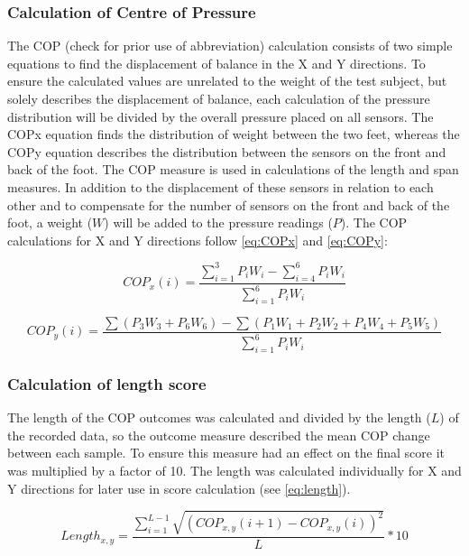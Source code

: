 \subsubsection{Calculation of Centre of Pressure}
The COP (check for prior use of abbreviation) calculation consists of two simple equations to find the displacement of balance in the X and Y directions. To ensure the calculated values are unrelated to the weight of the test subject, but solely describes the displacement of balance, each calculation of the pressure distribution will be divided by the overall pressure placed on all sensors. The COP\lowercase{x} equation finds the distribution of weight between the two feet, whereas the COP\lowercase{y} equation describes the distribution between the sensors on the front and back of the foot. The COP measure is used in calculations of the length and span measures. In addition to the displacement of these sensors in relation to each other and to compensate for the number of sensors on the front and back of the foot, a weight ($W$) will be added to the pressure readings ($P$).
The COP calculations for X and Y directions follow \eqref{eq:COPx} and \eqref{eq:COPy}:

\begin{equation}
COP_x(i) =  \frac{\sum_{i=1}^{3}P_i W_i - \sum_{i=4}^{6}P_i W_i}{\sum_{i=1}^{6}P_i W_i}
\end{equation} \label{eq:COPx}

\begin{equation}
COP_y(i) =  \frac{\sum(P_3 W_3 + P_6 W_6) - \sum(P_1 W_1+P_2 W_2+P_4 W_4+P_5 W_5)}{\sum_{i=1}^{6}P_i W_i}
\end{equation} \label{eq:COPy}



\subsubsection{Calculation of length score}
The length of the COP outcomes was calculated and divided by the length ($L$) of the recorded data, so the outcome measure described the mean COP change between each sample. To ensure this measure had an effect on the final score it was multiplied by a factor of 10. The length was calculated individually for X and Y directions for later use in score calculation (see \eqref{eq:length}).

\begin{equation}
	Length_{x,y} = \frac{\sum_{i=1}^{L-1}\sqrt{(COP_{x,y} (i+1)-COP_{x,y} (i))^2}}{L} * 10
\end{equation}


